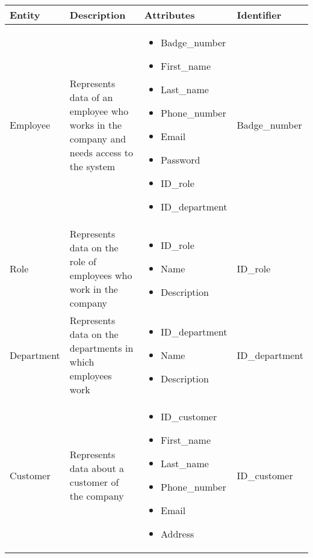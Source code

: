 \begin{longtable}{|p{}|p{} |p{}|p{} |}
    \hline
    \textbf{Entity} & \textbf{Description} & \textbf{Attributes} & \textbf{Identifier}  \\\hline

    Employee & Represents data of an employee who works in the company and needs access to the system &
    \begin{itemize}
        \vspace{-1em}
        \item Badge\_number
        \item First\_name
        \item Last\_name
        \item Phone\_number
        \item Email
        \item Password
        \item ID\_role
        \item ID\_department
    \end{itemize}
    &  Badge\_number\\\hline

    Role & Represents data on the role of employees who work in the company &
    \begin{itemize}
        \vspace{-1em}
        \item ID\_role
        \item Name
        \item Description
    \end{itemize}
    &  ID\_role\\\hline

    Department & Represents data on the departments in which employees work &
    \begin{itemize}
        \vspace{-1em}
        \item ID\_department
        \item Name
        \item Description
    \end{itemize}
    &  ID\_department\\\hline

    Customer & Represents data about a customer of the company &
    \begin{itemize}
        \vspace{-1em}
        \item ID\_customer
        \item First\_name
        \item Last\_name
        \item Phone\_number
        \item Email
        \item Address
    \end{itemize}
    &  ID\_customer\\\hline


\end{longtable}
